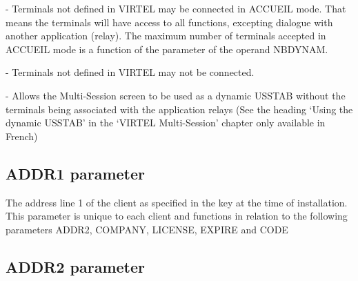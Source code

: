 \documentclass[letterpaper,10pt,english]{sphinxmanual}
\begin{document}
 - Terminals not defined in VIRTEL may be connected in ACCUEIL mode. That means the terminals will have access to all functions, excepting dialogue with another application (relay). The maximum number of terminals accepted in ACCUEIL mode is a function of the parameter of the operand NBDYNAM.

 - Terminals not defined in VIRTEL may not be connected.

 - Allows the Multi-Session screen to be used as a dynamic USSTAB without the terminals being associated with the application relays (See the heading ‘Using the dynamic USSTAB’ in the ‘VIRTEL Multi-Session’ chapter only available in French)


\subsection{ADDR1 parameter}
\label{\detokenize{Installation_Guide:index-30}}\label{\detokenize{Installation_Guide:addr1-parameter}}
\begin{sphinxVerbatim}[commandchars=\\\{\}]
 
\end{sphinxVerbatim}

The address line 1 of the client as specified in the key at the time of installation. This parameter is unique to each client and functions in relation to the following parameters ADDR2, COMPANY, LICENSE, EXPIRE and CODE


\subsection{ADDR2 parameter}
\label{\detokenize{Installation_Guide:addr2-parameter}}\label{\detokenize{Installation_Guide:index-31}}
\begin{sphinxVerbatim}[commandchars=\\\{\}]
 
\end{sphinxVerbatim}
\end{document}

